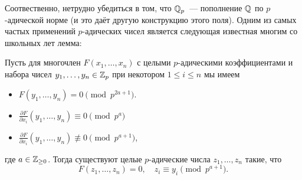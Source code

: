 	 Соотвественно, нетрудно убедиться в том, что $\mathbb{Q}_{p}$~--- пополнение $\mathbb{Q}$ по $p$-адической норме (и это даёт другую конструкцию этого поля). Одним из самых частых применений $p$-адических чисел является следующая известная многим со школьных лет лемма:    

	 \begin{lemma}\label{Henzel_lemma} 
	 	Пусть  для многочлен $F(x_1, \ldots, x_n)$ с целыми $p$-адическими коэффициентами и набора чисел $y_1, \ldots, y_n \in \mathbb{Z}_{p}$ при некотором $1 \le i \le n$ мы имеем 
	 	\begin{itemize}
	 		\item $F(y_1, \ldots, y_n) = 0 \pmod{p^{2a + 1}}$. 
	 		\item $\frac{\partial F}{\partial x_i}(y_1, \ldots, y_n) \equiv 0 \pmod{p^{a}}$
	 		\item $\frac{\partial F}{\partial x_i}(y_1, \ldots, y_n) \not\equiv 0 \pmod{p^{a + 1}}$,
	 	\end{itemize}
	 	где $a \in \mathbb{Z}_{\ge 0}$. Тогда существуют целые $p$-адические числа $z_1, \ldots, z_n$ такие, что 
	 	\[
	 		F(z_1, \ldots, z_n) = 0, \quad z_i \equiv y_i \pmod{p^{a + 1}}. 
	 	\]
	 \end{lemma}

